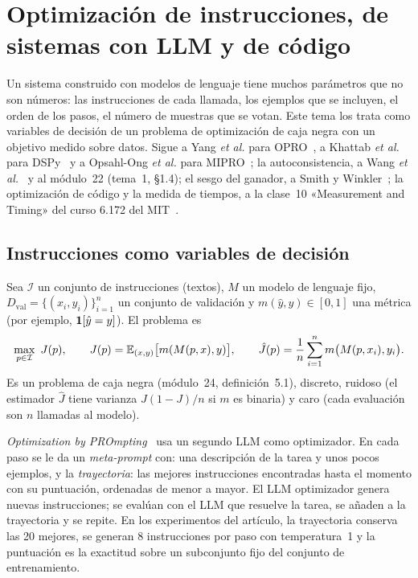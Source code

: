 \chapter{Optimización de instrucciones, de sistemas con LLM y de código}
\label{tema:2}

Un sistema construido con modelos de lenguaje tiene muchos parámetros que no son números: las instrucciones de cada llamada, los ejemplos que se incluyen, el orden de los pasos, el número de muestras que se votan. Este tema los trata como variables de decisión de un problema de optimización de caja negra con un objetivo medido sobre datos. Sigue a Yang \emph{et al.} para OPRO~\cite{opro}, a Khattab \emph{et al.} para DSPy~\cite{dspy} y a Opsahl-Ong \emph{et al.} para MIPRO~\cite{mipro}; la autoconsistencia, a Wang \emph{et al.}~\cite{wang-sc} y al módulo~22 (tema~1, §1.4); el sesgo del ganador, a Smith y Winkler~\cite{smith}; la optimización de código y la medida de tiempos, a la clase~10 «Measurement and Timing» del curso 6.172 del MIT~\cite{mit6172}.

\section{Instrucciones como variables de decisión}

\begin{definicion}\label{def:prompt-opt}
Sea $\mathcal{I}$ un conjunto de instrucciones (textos), $M$ un modelo de lenguaje fijo, $D_{\mathrm{val}}=\{(x_i,y_i)\}_{i=1}^{n}$ un conjunto de validación y $m(\hat y,y)\in[0,1]$ una métrica (por ejemplo, $\mathbf{1}[\hat y=y]$). El problema es
\[
\max_{p\in\mathcal{I}}\ J(p),\qquad J(p)=\mathbb{E}_{(x,y)}\bigl[m(M(p,x),y)\bigr],\qquad \hat J(p)=\frac1n\sum_{i=1}^{n}m\bigl(M(p,x_i),y_i\bigr).
\]
Es un problema de caja negra (módulo~24, definición~5.1), discreto, ruidoso (el estimador $\hat J$ tiene varianza $J(1-J)/n$ si $m$ es binaria) y caro (cada evaluación son $n$ llamadas al modelo).
\end{definicion}

\begin{definicion}[OPRO]\label{def:opro}
\emph{Optimization by PROmpting}~\cite{opro} usa un segundo LLM como optimizador. En cada paso se le da un \emph{meta-prompt} con: una descripción de la tarea y unos pocos ejemplos, y la \emph{trayectoria}: las mejores instrucciones encontradas hasta el momento con su puntuación, ordenadas de menor a mayor. El LLM optimizador genera nuevas instrucciones; se evalúan con el LLM que resuelve la tarea, se añaden a la trayectoria y se repite. En los experimentos del artículo, la trayectoria conserva las 20 mejores, se generan 8 instrucciones por paso con temperatura~1 y la puntuación es la exactitud sobre un subconjunto fijo del conjunto de entrenamiento.
\end{definicion}

